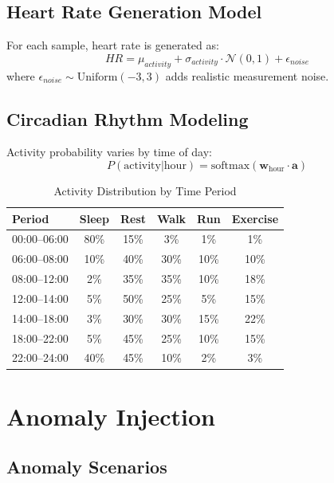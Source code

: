 \documentclass[conference]{IEEEtran}
\begin{document}
\subsection{Heart Rate Generation Model}
For each sample, heart rate is generated as:
\begin{equation}
HR = \mu_{activity} + \sigma_{activity} \cdot \mathcal{N}(0, 1) + \epsilon_{noise}
\end{equation}
where $\epsilon_{noise} \sim \text{Uniform}(-3, 3)$ adds realistic measurement noise.

\subsection{Circadian Rhythm Modeling}
Activity probability varies by time of day:
\begin{equation}
P(\text{activity} | \text{hour}) = \text{softmax}(\mathbf{w}_{\text{hour}} \cdot \mathbf{a})
\end{equation}

\begin{table}[H]
\centering
\caption{Activity Distribution by Time Period}
\label{tab:circadian}
\begin{tabular}{lccccc}
\toprule
\textbf{Period} & \textbf{Sleep} & \textbf{Rest} & \textbf{Walk} & \textbf{Run} & \textbf{Exercise} \\
\midrule
00:00--06:00 & 80\% & 15\% & 3\% & 1\% & 1\% \\
06:00--08:00 & 10\% & 40\% & 30\% & 10\% & 10\% \\
08:00--12:00 & 2\% & 35\% & 35\% & 10\% & 18\% \\
12:00--14:00 & 5\% & 50\% & 25\% & 5\% & 15\% \\
14:00--18:00 & 3\% & 30\% & 30\% & 15\% & 22\% \\
18:00--22:00 & 5\% & 45\% & 25\% & 10\% & 15\% \\
22:00--24:00 & 40\% & 45\% & 10\% & 2\% & 3\% \\
\bottomrule
\end{tabular}
\end{table}

\section{Anomaly Injection}

\subsection{Anomaly Scenarios}
\end{document}
